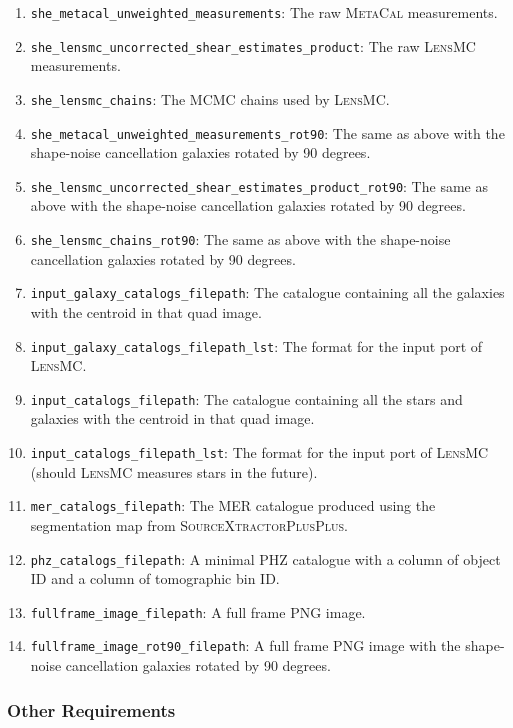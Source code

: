 \documentclass[11pt]{EuclidVIS}
\numberwithin{table}{section}
\numberwithin{figure}{section}
\begin{document}
\begin{enumerate}
    \item \texttt{she\_metacal\_unweighted\_measurements}: The raw \textsc{MetaCal} measurements.
    \item \texttt{she\_lensmc\_uncorrected\_shear\_estimates\_product}: The raw \textsc{LensMC} measurements.
    \item \texttt{she\_lensmc\_chains}: The MCMC chains used by \textsc{LensMC}.
    \item \texttt{she\_metacal\_unweighted\_measurements\_rot90}: The same as above with the shape-noise cancellation galaxies rotated by 90 degrees.
    \item \texttt{she\_lensmc\_uncorrected\_shear\_estimates\_product\_rot90}: The same as above with the shape-noise cancellation galaxies rotated by 90 degrees.
    \item \texttt{she\_lensmc\_chains\_rot90}: The same as above with the shape-noise cancellation galaxies rotated by 90 degrees.
    \item \texttt{input\_galaxy\_catalogs\_filepath}: The catalogue containing all the galaxies with the centroid in that quad image.
    \item \texttt{input\_galaxy\_catalogs\_filepath\_lst}: The format for the input port of \textsc{LensMC}.
    \item \texttt{input\_catalogs\_filepath}: The catalogue containing all the stars and galaxies with the centroid in that quad image.
    \item \texttt{input\_catalogs\_filepath\_lst}: The format for the input port of \textsc{LensMC} (should \textsc{LensMC} measures stars in the future).
    \item \texttt{mer\_catalogs\_filepath}: The MER catalogue produced using the segmentation map from \textsc{SourceXtractorPlusPlus}.
    \item \texttt{phz\_catalogs\_filepath}: A minimal PHZ catalogue with a column of object ID and a column of tomographic bin ID.
    \item \texttt{fullframe\_image\_filepath}: A full frame PNG image.
    \item \texttt{fullframe\_image\_rot90\_filepath}: A full frame PNG image with the shape-noise cancellation galaxies rotated by 90 degrees.
\end{enumerate}

\subsubsection{Other Requirements}
\end{document}
